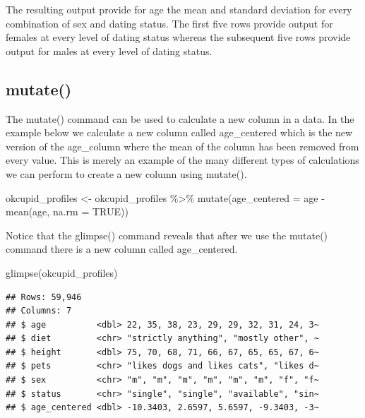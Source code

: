 \documentclass[
]{krantz}
\makeatletter
\newenvironment{Shaded}{\begin{snugshade}}{\end{snugshade}}
\newcommand{\AttributeTok}[1]{\textcolor[rgb]{0.61,0.61,0.61}{#1}}
\newcommand{\ConstantTok}[1]{\textcolor[rgb]{0,0,0}{#1}}
\newcommand{\FunctionTok}[1]{\textcolor[rgb]{0,0,0}{#1}}
\newcommand{\NormalTok}[1]{#1}
\newcommand{\OtherTok}[1]{\textcolor[rgb]{0.37,0.37,0.37}{#1}}
\newcommand{\SpecialCharTok}[1]{\textcolor[rgb]{0,0,0}{#1}}
\newenvironment{kframe}{%
\medskip{}
\setlength{\fboxsep}{.8em}
 \def\at@end@of@kframe{}%
 \ifinner\ifhmode%
  \def\at@end@of@kframe{\end{minipage}}%
  \begin{minipage}{\columnwidth}%
 \fi\fi%
 \def\FrameCommand##1{\hskip\@totalleftmargin \hskip-\fboxsep
 \colorbox{shadecolor}{##1}\hskip-\fboxsep
     \hskip-\linewidth \hskip-\@totalleftmargin \hskip\columnwidth}%
 \MakeFramed {\advance\hsize-\width
   \@totalleftmargin\z@ \linewidth\hsize
   \@setminipage}}%
 {\par\unskip\endMakeFramed%
 \at@end@of@kframe}
\renewenvironment{Shaded}{\begin{kframe}}{\end{kframe}}
\makeatother
\begin{document}
The resulting output provide for age the mean and standard deviation for every combination of sex and dating status. The first five rows provide output for females at every level of dating status whereas the subsequent five rows provide output for males at every level of dating status.

\hypertarget{mutate}{%
\subsection{mutate()}\label{mutate}}

The mutate() command can be used to calculate a new column in a data. In the example below we calculate a new column called age\_centered which is the new version of the age\_column where the mean of the column has been removed from every value. This is merely an example of the many different types of calculations we can perform to create a new column using mutate().

\begin{Shaded}
\begin{Highlighting}[]
\NormalTok{okcupid\_profiles }\OtherTok{\textless{}{-}}\NormalTok{ okcupid\_profiles }\SpecialCharTok{\%\textgreater{}\%}
  \FunctionTok{mutate}\NormalTok{(}\AttributeTok{age\_centered =}\NormalTok{ age }\SpecialCharTok{{-}} \FunctionTok{mean}\NormalTok{(age, }\AttributeTok{na.rm =} \ConstantTok{TRUE}\NormalTok{))}
\end{Highlighting}
\end{Shaded}

Notice that the glimpse() command reveals that after we use the mutate() command there is a new column called age\_centered.

\begin{Shaded}
\begin{Highlighting}[]
\FunctionTok{glimpse}\NormalTok{(okcupid\_profiles)}
\end{Highlighting}
\end{Shaded}

\begin{verbatim}
## Rows: 59,946
## Columns: 7
## $ age          <dbl> 22, 35, 38, 23, 29, 29, 32, 31, 24, 3~
## $ diet         <chr> "strictly anything", "mostly other", ~
## $ height       <dbl> 75, 70, 68, 71, 66, 67, 65, 65, 67, 6~
## $ pets         <chr> "likes dogs and likes cats", "likes d~
## $ sex          <chr> "m", "m", "m", "m", "m", "m", "f", "f~
## $ status       <chr> "single", "single", "available", "sin~
## $ age_centered <dbl> -10.3403, 2.6597, 5.6597, -9.3403, -3~
\end{verbatim}
\end{document}

